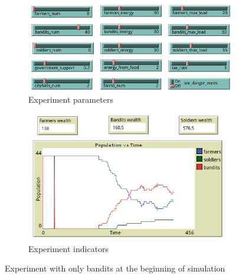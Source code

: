 \documentclass{wscpaperproc}
\begin{document}
\begin{figure}[h!]
    \begin{subfigure}{0.45\textwidth}
    \includegraphics[width=\textwidth]{Images/Exp3_sliders.png}
    \caption{Experiment parameters}
    \end{subfigure}
    \hfill
    \begin{subfigure}{0.45\textwidth}
    \includegraphics[width=\textwidth]{Images/Exp3_indicators.png}
    \caption{Experiment indicators}
    \end{subfigure}%
    \caption{Experiment with only bandits at the beginning of simulation}
    \label{bandits_only}
\end{figure}
\end{document}
